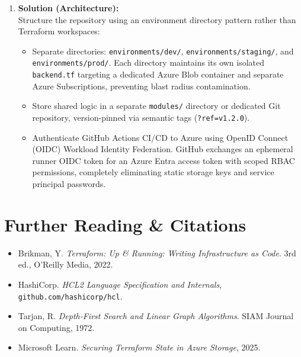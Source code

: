\begin{enumerate}[leftmargin=18pt]
  \item \textbf{Solution (Architecture):}\\
  Structure the repository using an environment directory pattern rather than Terraform workspaces:
  \begin{itemize}[leftmargin=12pt]
    \item Separate directories: \texttt{environments/dev/}, \texttt{environments/staging/}, and \texttt{environments/prod/}. Each directory maintains its own isolated \texttt{backend.tf} targeting a dedicated Azure Blob container and separate Azure Subscriptions, preventing blast radius contamination.
    \item Store shared logic in a separate \texttt{modules/} directory or dedicated Git repository, version-pinned via semantic tags (\texttt{?ref=v1.2.0}).
    \item Authenticate GitHub Actions CI/CD to Azure using OpenID Connect (OIDC) Workload Identity Federation. GitHub exchanges an ephemeral runner OIDC token for an Azure Entra access token with scoped RBAC permissions, completely eliminating static storage keys and service principal passwords.
  \end{itemize}
\end{enumerate}

\section{Further Reading \& Citations}
\begin{itemize}[leftmargin=15pt]
  \item Brikman, Y. \emph{Terraform: Up \& Running: Writing Infrastructure as Code}. 3rd ed., O'Reilly Media, 2022.
  \item HashiCorp. \emph{HCL2 Language Specification and Internals}, \texttt{github.com/hashicorp/hcl}.
  \item Tarjan, R. \emph{Depth-First Search and Linear Graph Algorithms}. SIAM Journal on Computing, 1972.
  \item Microsoft Learn. \emph{Securing Terraform State in Azure Storage}, 2025.
\end{itemize}
